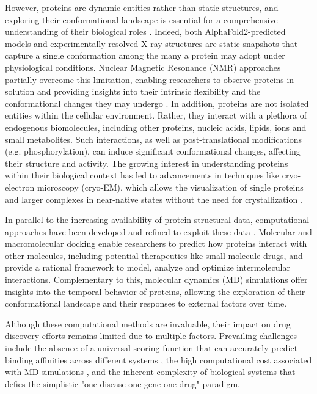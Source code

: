 However, proteins are dynamic entities rather than static structures, and exploring their conformational landscape is essential for a comprehensive understanding of their biological roles \cite{henzler-wildman_dynamic_2007, motlagh_ensemble_2014}. Indeed, both AlphaFold2-predicted models and experimentally-resolved X-ray structures are static snapshots that capture a single conformation among the many a protein may adopt under physiological conditions. Nuclear Magnetic Resonance (NMR) approaches partially overcome this limitation, enabling researchers to observe proteins in solution and providing insights into their intrinsic flexibility and the conformational changes they may undergo \cite{kleckner_introduction_2011}. In addition, proteins are not isolated entities within the cellular environment. Rather, they interact with a plethora of endogenous biomolecules, including other proteins, nucleic acids, lipids, ions and small metabolites. Such interactions, as well as post-translational modifications (e.g. phosphorylation), can induce significant conformational changes, affecting their structure and activity. The growing interest in understanding proteins within their biological context has led to advancements in techniques like cryo-electron microscopy (cryo-EM), which allows the visualization of single proteins and larger complexes in near-native states without the need for crystallization \cite{kuhlbrandt_resolution_2014, renaud_cryo-em_2018, bai_how_2015}.

In parallel to the increasing availability of protein structural data, computational approaches have been developed and refined to exploit these data \cite{pagadala_software_2017, hollingsworth_molecular_2018}. Molecular and macromolecular docking enable researchers to predict how proteins interact with other molecules, including potential therapeutics like small-molecule drugs, and provide a rational framework to model, analyze and optimize intermolecular interactions. Complementary to this, molecular dynamics (MD) simulations offer insights into the temporal behavior of proteins, allowing the exploration of their conformational landscape and their responses to external factors over time. 

Although these computational methods are invaluable, their impact on drug discovery efforts remains limited due to multiple factors. Prevailing challenges include the absence of a universal scoring function that can accurately predict binding affinities across different systems \cite{li_overview_2019, shen_machine_2020}, the high computational cost associated with MD simulations \cite{hollingsworth_molecular_2018}, and the inherent complexity of biological systems that defies the simplistic "one disease-one gene-one drug" paradigm.

